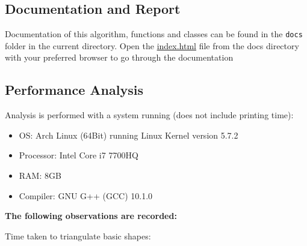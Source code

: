 \hypertarget{documentation-and-report}{%
\subsection{Documentation and Report}\label{documentation-and-report}}

Documentation of this algorithm, functions and classes can be found in
the \texttt{docs} folder in the current directory. Open the
\href{../Triangulation/docs/html/index.html}{index.html} file from the
docs directory with your preferred browser to go through the
documentation

\hypertarget{performance-analysis}{%
\subsection{Performance Analysis}\label{performance-analysis}}

Analysis is performed with a system running (does not include printing
time):

\begin{itemize}
\tightlist
\item
  OS: Arch Linux (64Bit) running Linux Kernel version 5.7.2
\item
  Processor: Intel Core i7 7700HQ
\item
  RAM: 8GB
\item
  Compiler: GNU G++ (GCC) 10.1.0
\end{itemize}

\textbf{The following observations are recorded:}

Time taken to triangulate basic shapes:

